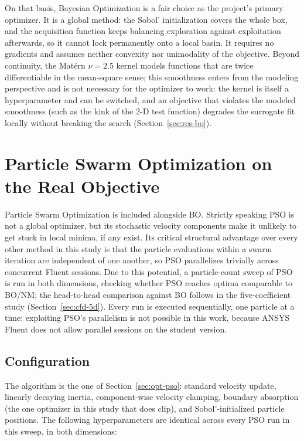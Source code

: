 On that basis, Bayesian Optimization is a fair choice as the project's
primary optimizer.  It is a global method: the Sobol' initialization covers
the whole box, and the acquisition function keeps balancing exploration
against exploitation afterwards, so it cannot lock permanently onto a local
basin.  It requires no gradients and assumes neither convexity nor
unimodality of the objective.  Beyond continuity, the Mat\'ern $\nu=2.5$
kernel models functions that are twice differentiable in the mean-square
sense; this smoothness enters from the modeling perspective and is not
necessary for the optimizer to work: the kernel is itself a hyperparameter
and can be switched, and an objective that violates the modeled smoothness
(such as the kink of the 2-D test function) degrades the surrogate fit
locally without breaking the search (Section~\ref{sec:res-bo}).

\section{Particle Swarm Optimization on the Real Objective}
\label{sec:cfd-pso}

Particle Swarm Optimization is included alongside BO.  Strictly speaking
PSO is not a global optimizer, but its stochastic velocity components make
it unlikely to get stuck in local minima, if any exist.  Its critical
structural advantage over every other method in this study is that the
particle evaluations within a swarm iteration are independent of one
another, so PSO parallelizes trivially across concurrent Fluent sessions.
Due to this potential, a particle-count sweep of PSO is run in both
dimensions, checking whether PSO reaches optima comparable to BO/NM; the
head-to-head comparison against BO follows in the five-coefficient study
(Section~\ref{sec:cfd-5d}).  Every run is executed sequentially, one
particle at a time: exploiting PSO's parallelism is not possible in this
work, because ANSYS Fluent does not allow parallel sessions on the student
version.

\subsection{Configuration}
\label{sec:cfd-pso-config}

The algorithm is the one of Section~\ref{sec:opt-pso}: standard velocity
update, linearly decaying inertia, component-wise velocity clamping,
boundary absorption (the one optimizer in this study that does clip), and
Sobol'-initialized particle positions.  The following hyperparameters are
identical across every PSO run in this sweep, in both dimensions:

